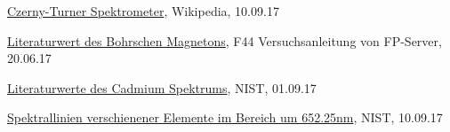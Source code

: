 \begin{thebibliography}{9}

  \href{https://de.wikipedia.org/wiki/Monochromator#/media/File:Czerny-turner.png}{Czerny-Turner Spektrometer},
  Wikipedia,
  10.09.17

  \href{http://www.physi.uni-heidelberg.de/Einrichtungen/FP/anleitungen/F44.pdf}{Literaturwert des Bohrschen Magnetons},
  F44 Versuchsanleitung von FP-Server,
  20.06.17

  \href{https://physics.nist.gov/PhysRefData/Handbook/Tables/cadmiumtable2.htm}{Literaturwerte des Cadmium Spektrums},
  NIST,
  01.09.17

  \href{https://physics.nist.gov/cgi-bin/ASD/lines1.pl?spectra=&low_wl=652.15&upp_wn=&upp_wl=652.35&low_wn=&unit=1&submit=Retrieve+Data&de=0&java_window=3&java_mult=&format=0&line_out=0&en_unit=0&output=0&bibrefs=1&page_size=15&show_obs_wl=1&show_calc_wl=1&order_out=0&max_low_enrg=&show_av=2&max_upp_enrg=&tsb_value=0&min_str=&A_out=0&intens_out=on&max_str=&allowed_out=1&forbid_out=1&min_accur=&min_intens=&conf_out=on&term_out=on&enrg_out=on&J_out=on}{Spektrallinien verschienener Elemente im Bereich um 652.25nm},
  NIST,
  10.09.17

\end{thebibliography}
